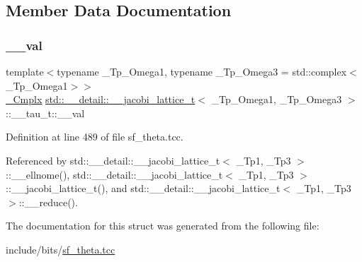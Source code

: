 \subsection{Member Data Documentation}
\mbox{\label{structstd_1_1____detail_1_1____jacobi__lattice__t_1_1____tau__t_a00e3e1dca58683668fd457120f83e736}} 
\subsubsection{\texorpdfstring{\+\_\+\+\_\+val}{\_\_val}}
{\footnotesize\ttfamily template$<$typename \+\_\+\+Tp\+\_\+\+Omega1, typename \+\_\+\+Tp\+\_\+\+Omega3 = std\+::complex$<$\+\_\+\+Tp\+\_\+\+Omega1$>$$>$ \\
\hyperlink{structstd_1_1____detail_1_1____jacobi__lattice__t_a77e286c37544d6ba5e4fb5542d3aad5f}{\+\_\+\+Cmplx} \hyperlink{structstd_1_1____detail_1_1____jacobi__lattice__t}{std\+::\+\_\+\+\_\+detail\+::\+\_\+\+\_\+jacobi\+\_\+lattice\+\_\+t}$<$ \+\_\+\+Tp\+\_\+\+Omega1, \+\_\+\+Tp\+\_\+\+Omega3 $>$\+::\+\_\+\+\_\+tau\+\_\+t\+::\+\_\+\+\_\+val}



Definition at line 489 of file sf\+\_\+theta.\+tcc.



Referenced by std\+::\+\_\+\+\_\+detail\+::\+\_\+\+\_\+jacobi\+\_\+lattice\+\_\+t$<$ \+\_\+\+Tp1, \+\_\+\+Tp3 $>$\+::\+\_\+\+\_\+ellnome(), std\+::\+\_\+\+\_\+detail\+::\+\_\+\+\_\+jacobi\+\_\+lattice\+\_\+t$<$ \+\_\+\+Tp1, \+\_\+\+Tp3 $>$\+::\+\_\+\+\_\+jacobi\+\_\+lattice\+\_\+t(), and std\+::\+\_\+\+\_\+detail\+::\+\_\+\+\_\+jacobi\+\_\+lattice\+\_\+t$<$ \+\_\+\+Tp1, \+\_\+\+Tp3 $>$\+::\+\_\+\+\_\+reduce().



The documentation for this struct was generated from the following file\+:\begin{DoxyCompactItemize}
\item 
include/bits/\hyperlink{sf__theta_8tcc}{sf\+\_\+theta.\+tcc}\end{DoxyCompactItemize}
